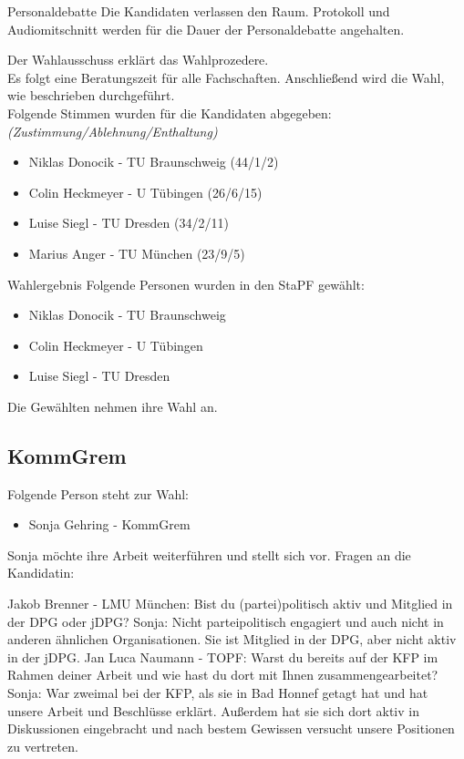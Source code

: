     \begin{info}{Personaldebatte}
      Die Kandidaten verlassen den Raum. Protokoll und Audiomitschnitt werden für die Dauer der Personaldebatte angehalten.
    \end{info}

    Der Wahlausschuss erklärt das Wahlprozedere. \\
    Es folgt eine Beratungszeit für alle Fachschaften. Anschließend wird die Wahl, wie beschrieben durchgeführt. \\

    Folgende Stimmen wurden für die Kandidaten abgegeben: \textit{(Zustimmung/Ablehnung/Enthaltung)}
    \begin{itemize}
      \item Niklas Donocik - TU Braunschweig  (44/1/2)
      \item Colin Heckmeyer - U Tübingen  (26/6/15)
      \item Luise Siegl - TU Dresden  (34/2/11)
      \item Marius Anger - TU München  (23/9/5)
    \end{itemize}

    \begin{success}{Wahlergebnis}
      Folgende Personen wurden in den StaPF gewählt:
        \begin{itemize}
          \item Niklas Donocik - TU Braunschweig
          \item Colin Heckmeyer - U Tübingen
          \item Luise Siegl - TU Dresden
        \end{itemize}
        \tcblower
        Die Gewählten nehmen ihre Wahl an.
    \end{success}

  \subsection{KommGrem}
    Folgende Person steht zur Wahl:
    \begin{itemize}
      \item Sonja Gehring - KommGrem
    \end{itemize}
    Sonja möchte ihre Arbeit weiterführen und stellt sich vor.
    Fragen an die Kandidatin:
    \begin{outline}
      \1 Jakob Brenner - LMU München: Bist du (partei)politisch aktiv und Mitglied in der DPG oder jDPG?
        \2 Sonja: Nicht parteipolitisch engagiert und auch nicht in anderen ähnlichen Organisationen. Sie ist Mitglied in der DPG, aber nicht aktiv in der jDPG.
      \1 Jan Luca Naumann - TOPF: Warst du bereits auf der KFP im Rahmen deiner Arbeit und wie hast du dort mit Ihnen zusammengearbeitet?
        \2 Sonja: War zweimal bei der KFP, als sie in Bad Honnef getagt hat und hat unsere Arbeit und Beschlüsse erklärt. Außerdem hat sie sich dort aktiv in Diskussionen eingebracht und nach bestem Gewissen versucht unsere Positionen zu vertreten.
    \end{outline}

